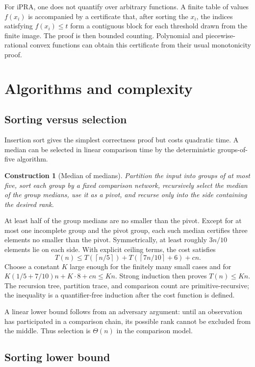 \documentclass[11pt]{article}
\newtheorem{construction}[theorem]{Construction}
\newcommand{\iPRA}{\ensuremath{\mathrm{iPRA}}}
\newcommand{\ceil}[1]{\left\lceil#1\right\rceil}
\begin{document}
For \iPRA, one does not quantify over arbitrary functions.  A finite table of
values $f(x_i)$ is accompanied by a certificate that, after sorting the
$x_i$, the indices satisfying $f(x_i)\leq t$ form a contiguous block for each
threshold drawn from the finite image.  The proof is then bounded counting.
Polynomial and piecewise-rational convex functions can obtain this certificate
from their usual monotonicity proof.

\section{Algorithms and complexity}

\subsection{Sorting versus selection}

Insertion sort gives the simplest correctness proof but costs quadratic time.
A median can be selected in linear comparison time by the deterministic
groups-of-five algorithm.

\begin{construction}[Median of medians]
Partition the input into groups of at most five, sort each group by a fixed
comparison network, recursively select the median of the group medians, use it
as a pivot, and recurse only into the side containing the desired rank.
\end{construction}

At least half of the group medians are no smaller than the pivot.  Except for
at most one incomplete group and the pivot group, each such median certifies
three elements no smaller than the pivot.  Symmetrically, at least roughly
$3n/10$ elements lie on each side.  With explicit ceiling terms, the cost
satisfies
\[
 T(n)\leq T(\ceil{n/5})+T(\ceil{7n/10}+6)+cn.
\]
Choose a constant $K$ large enough for the finitely many small cases and for
$K(1/5+7/10)n+K\cdot 8+cn\leq Kn$.  Strong induction then proves
$T(n)\leq Kn$.  The recursion tree, partition trace, and comparison count are
primitive-recursive; the inequality is a quantifier-free induction after the
cost function is defined.

A linear lower bound follows from an adversary argument: until an observation
has participated in a comparison chain, its possible rank cannot be excluded
from the middle.  Thus selection is $\Theta(n)$ in the comparison model.

\subsection{Sorting lower bound}
\end{document}
